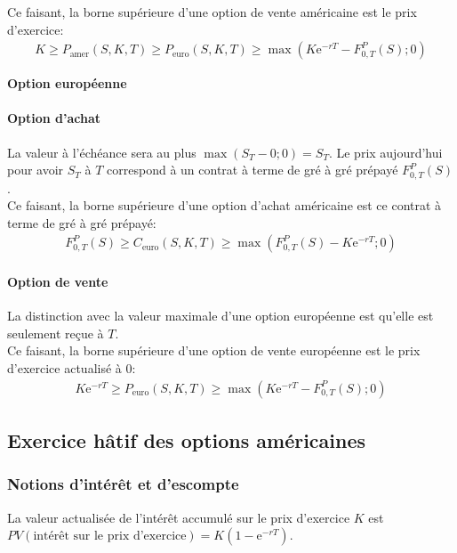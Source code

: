 \documentclass[10pt, french]{article}
\begin{document}
\begin{multicols*}{2}
Ce faisant, \textcolor{cobalt}{la borne supérieure d'une option de vente américaine est le prix d'exercice}:
\begin{align*}
	K	
	\geq	P_{\text{amer}}(S, K, T)
	\geq	P_{\text{euro}}(S, K, T)
	\geq	\max\left(K\textrm{e}^{-rT} - F_{0, T}^{P}(S); 0\right)	
\end{align*}

\begin{center}
	\textbf{Option européenne}
\end{center}

\paragraph{Option d'achat}
La valeur à l'échéance sera au plus $\max(S_{T} - 0; 0) = S_{T}$. Le prix aujourd'hui pour avoir $S_{T}$ à $T$ correspond à un contrat à terme de gré à gré prépayé $F_{0, T}^{P}(S)$.\\

Ce faisant, \textcolor{cobalt}{la borne supérieure d'une option d'achat américaine est ce contrat à terme de gré à gré prépayé}:
\begin{align*}
	F_{0, T}^{P}(S)
	\geq	C_{\text{euro}}(S, K, T)
	\geq	\max\left(F_{0, T}^{P}(S) - K\textrm{e}^{-rT}; 0\right)
\end{align*}

\paragraph{Option de vente}	La distinction avec la valeur maximale d'une option européenne est qu'elle est seulement reçue à $T$.\\

Ce faisant, \textcolor{cobalt}{la borne supérieure d'une option de vente européenne est le prix d'exercice actualisé à 0}:
\begin{align*}
	K \textrm{e}^{-rT}
	\geq	P_{\text{euro}}(S, K, T)
	\geq	\max\left(K\textrm{e}^{-rT} - F_{0, T}^{P}(S); 0\right)
\end{align*}

\columnbreak
\subsection{Exercice hâtif des options américaines}
\subsubsection*{Notions d'intérêt et d'escompte}
La valeur actualisée de l'intérêt accumulé sur le prix d'exercice $K$ est $PV(\text{intérêt sur le prix d'exercice}) = K(1 - \textrm{e}^{-rT})$.\\


\end{multicols*}
\end{document}
